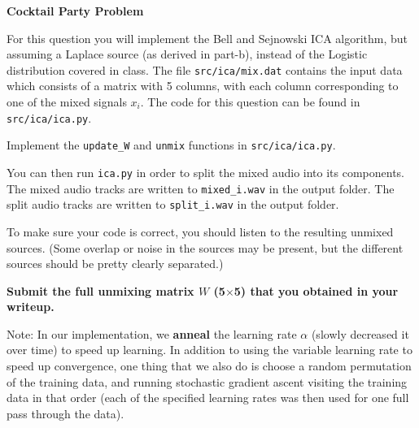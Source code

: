 \item {} \textbf{Cocktail Party Problem}

For this question you will implement the Bell and Sejnowski ICA algorithm, but
assuming a Laplace source (as derived in part-b), instead of the Logistic distribution
covered in class. The file \texttt{src/ica/mix.dat} contains the input data which consists of a matrix
with 5 columns, with each column corresponding to one of the mixed signals
$x_i$. The code for this question can be found in \texttt{src/ica/ica.py}.

Implement the \texttt{update\_W} and \texttt{unmix} functions in \texttt{src/ica/ica.py}.

You can then run \texttt{ica.py} in order to split the mixed audio into its components.
The mixed audio tracks are written to \texttt{mixed\_i.wav} in the output folder.
The split audio tracks are written to \texttt{split\_i.wav} in the output folder.

To make sure your code is correct, you should listen to the
resulting unmixed sources.  (Some overlap or noise in the sources may be present,
but the different sources should be pretty clearly separated.)

\textbf{Submit the full unmixing matrix $W$ (5$\times$5) that you obtained in your writeup.}

Note: In our implementation, we {\bf anneal} the learning rate $\alpha$
(slowly decreased it over time) to speed up learning. In addition to using the variable
learning rate to speed up convergence, one thing that we also do is
choose a random permutation of the training data, and running stochastic
gradient ascent visiting the training data in that order (each of the
specified learning rates was then used for one full pass through the data).

